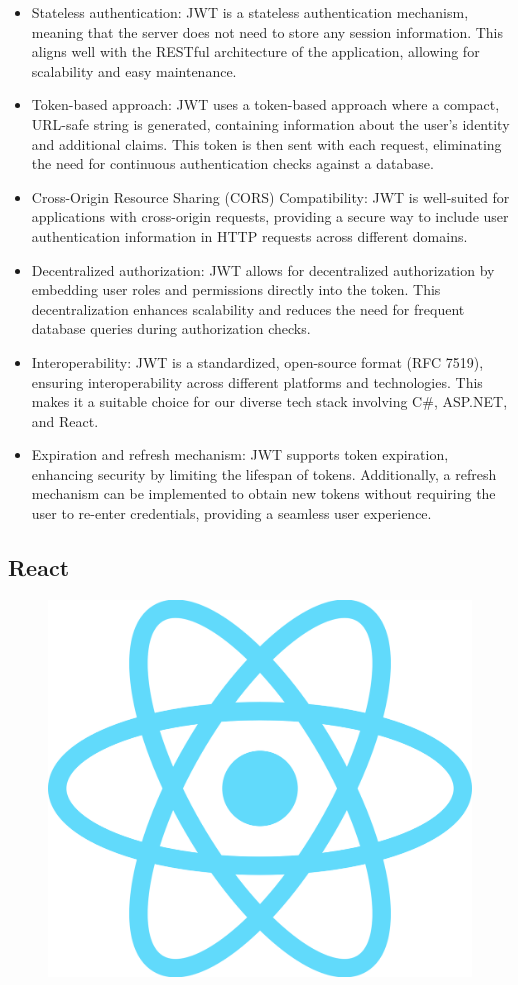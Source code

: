 \begin{itemize}

    \item Stateless authentication: JWT is a stateless authentication mechanism, meaning that the server does not need to store any session information.
    This aligns well with the RESTful architecture of the application, allowing for scalability and easy maintenance.
    \item Token-based approach: JWT uses a token-based approach where a compact, URL-safe string is generated, containing information about the user’s identity and additional claims.
    This token is then sent with each request, eliminating the need for continuous authentication checks against a database.
    \item Cross-Origin Resource Sharing (CORS) Compatibility: JWT is well-suited for applications with cross-origin requests, providing a secure way to include user authentication information in HTTP requests across different domains.
    \item Decentralized authorization: JWT allows for decentralized authorization by embedding user roles and permissions directly into the token.
    This decentralization enhances scalability and reduces the need for frequent database queries during authorization checks.
    \item Interoperability: JWT is a standardized, open-source format (RFC 7519), ensuring interoperability across different platforms and technologies.
    This makes it a suitable choice for our diverse tech stack involving C\#, ASP.NET, and React.
    \item Expiration and refresh mechanism: JWT supports token expiration, enhancing security by limiting the lifespan of tokens.
    Additionally, a refresh mechanism can be implemented to obtain new tokens without requiring the user to re-enter credentials, providing a seamless user experience.

\end{itemize}

\subsection{React}

\begin{figure}[H]
    \hfill
    \includegraphics[width=0.1\linewidth]{../assets/tools-logos/react.png}
    \hspace{1cm}
\end{figure}

